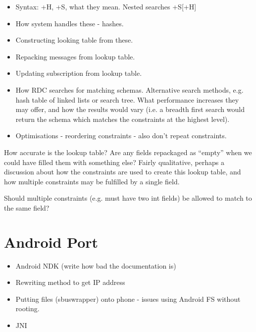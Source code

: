 \documentclass[12pt,twoside,notitlepage]{report}
\begin{document}
\begin{itemize}

\item Syntax: +H, +S, what they mean. Nested searches +S[+H]

\item How system handles these - hashes.

\item Constructing looking table from these.

\item Repacking messages from lookup table.

\item Updating subscription from lookup table.

\item How RDC searches for matching schemas. Alternative search methods, e.g. hash table of linked lists or search tree. What performance increases they may offer, and how the results would vary (i.e. a breadth first search would return the schema which matches the constraints at the highest level).

\item Optimisations - reordering constraints - also don't repeat constraints.

\end{itemize}

How accurate is the lookup table? 
Are any fields repackaged as ``empty'' when we could have filled them with something else? 
Fairly qualitative, perhaps a discussion about how the constraints are used to create this lookup table, and how multiple constraints may be fulfilled by a single field.

Should multiple constraints (e.g. must have two int fields) be allowed to match to the same field?

\section{Android Port}

\begin{itemize}

\item Android NDK (write how bad the documentation is)

\item Rewriting method to get IP address

\item Putting files (sbuswrapper) onto phone - issues using Android FS without rooting.

\item JNI

\end{itemize}
\end{document}
